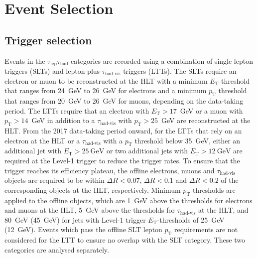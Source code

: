\section{Event Selection}

\subsection{Trigger selection}
\label{sec:DiHiggs:triggers}
Events in the $\tau_\text{lep}\tau_\text{had}$ categories 
are recorded using a combination of single-lepton triggers (SLTs) 
and lepton-plus-$\tau_\text{had-vis}$ triggers (LTTs). 
The SLTs require an electron or muon to be reconstructed 
at the HLT with a minimum $E_\text{T}$ threshold that 
ranges from 24~GeV to 26~GeV for electrons and 
a minimum $p_\text{T}$ threshold that 
ranges from 20~GeV to 26~GeV for muons, 
depending on the data-taking period. 
The LTTs require that an electron with $E_\text{T}>17$~GeV 
or a muon with $p_\text{T}>14$~GeV in addition to 
a $\tau_\text{had-vis}$ with $p_\text{T}>25$~GeV are reconstructed at the HLT. 
From the 2017 data-taking period onward, 
for the LTTs that rely on an electron at the HLT or 
a $\tau_\text{had-vis}$ with a $p_\text{T}$ threshold below 35~GeV, 
either an additional jet with $E_\text{T}>25~\text{GeV}$ or 
two additional jets with $E_\text{T}>12~\text{GeV}$ are required 
at the Level-1 trigger to reduce the trigger rates. 
To ensure that the trigger reaches its efficiency plateau, 
the offline electrons, muons and $\tau_\text{had-vis}$ objects 
are required to be within $\Delta R<0.07$, $\Delta R<0.1$ 
and $\Delta R<0.2$ of the corresponding objects at the HLT, respectively. 
Minimum $p_\text{T}$ thresholds are applied to the offline objects, 
which are 1~GeV above the thresholds for electrons and muons at the HLT, 
5~GeV above the thresholds for $\tau_\text{had-vis}$ at the HLT, 
and 80~GeV (45~GeV) for jets with 
Level-1 trigger $E_\text{T}$-thresholds of 25~GeV (12~GeV). 
Events which pass the offline SLT lepton $p_\text{T}$ requirements 
are not considered for the LTT to ensure no overlap with the SLT category. 
These two categories are analysed separately.
